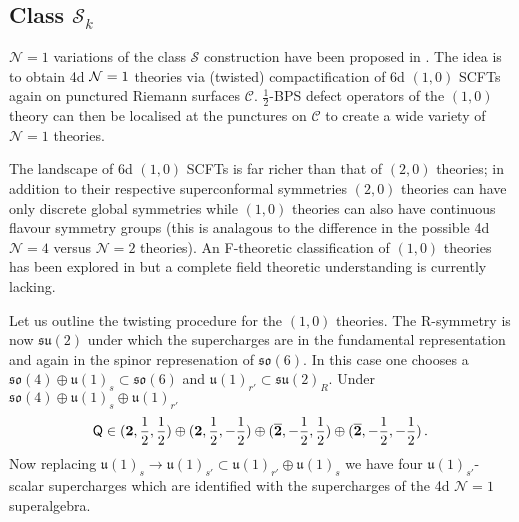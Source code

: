\documentclass[main.tex]{subfiles}
\begin{document}
\subsection{Class \texorpdfstring{$\mathcal{S}_k$}{Sk}}\label{sec:introSk}
$\mathcal{N}=1$ variations of the class $\mathcal{S}$ construction have been proposed in \cite{Gaiotto:2015usa,Bah:2017gph,Heckman:2016xdl,Razamat:2016dpl,Coman:2015bqq,Morrison:2016nrt,Franco:2015jna,Hanany:2015pfa,Apruzzi:2016nfr,DelZotto:2017pti,Apruzzi:2017iqe,Hassler:2017arf,Kim:2018lfo,Razamat:2018gro}.  
The idea is to obtain 4d $\mathcal{N}=1$ theories via (twisted) compactification of 6d $(1,0)$ SCFTs again on punctured Riemann surfaces $\mathcal{C}$.  $\frac{1}{2}$-BPS defect operators of the $(1,0)$ theory can then be localised at the punctures on $\mathcal{C}$ to create a wide variety of $\mathcal{N}=1$ theories.  

The landscape of 6d $(1,0)$ SCFTs is far richer than that of $(2,0)$ theories; in addition to their respective superconformal symmetries $(2,0)$ theories can have only discrete global symmetries while $(1,0)$ theories can also have continuous flavour symmetry groups (this is analagous to the difference in the possible 4d $\mathcal{N}=4$ versus $\mathcal{N}=2$ theories).  An F-theoretic classification of $(1,0)$ theories has been explored in \cite{Heckman:2013pva,DelZotto:2014hpa,Heckman:2015bfa,Bhardwaj:2015oru} but a complete field theoretic understanding is currently lacking.  

Let us outline the twisting procedure for the $(1,0)$ theories.  The R-symmetry is now $\mathfrak{su}(2)$ under which the supercharges are in the fundamental representation and again in the spinor represenation of $\mathfrak{so}(6)$.  In this case one chooses a $\mathfrak{so}(4)\oplus\mathfrak{u}(1)_s\subset\mathfrak{so}(6)$ and $\mathfrak{u}(1)_{r'}\subset\mathfrak{su}(2)_R$.  Under $\mathfrak{so}(4)\oplus\mathfrak{u}(1)_s\oplus\mathfrak{u}(1)_{r'}$
\begin{equation}\label{eqn:Sktopotwist}
\mathsf{Q}\in(\mathbf{2},\frac{1}{2},\frac{1}{2})\oplus(\mathbf{2},\frac{1}{2},-\frac{1}{2})\oplus(\overline{\mathbf{2}},-\frac{1}{2},\frac{1}{2})\oplus(\overline{\mathbf{2}},-\frac{1}{2},-\frac{1}{2})\,.
\end{equation}
Now replacing $\mathfrak{u}(1)_s\to \mathfrak{u}(1)_{s'}\subset\mathfrak{u}(1)_{r'}\oplus \mathfrak{u}(1)_s$ we have four $\mathfrak{u}(1)_{s'}$-scalar supercharges which are identified with the supercharges of the 4d $\mathcal{N}=1$ superalgebra.
\end{document}
